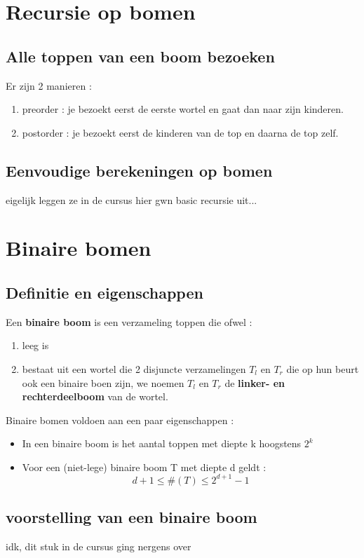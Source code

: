 \documentclass{report}
\begin{document}
  		\section{Recursie op bomen}
  			\subsection{Alle toppen van een boom bezoeken}
  				Er zijn 2 manieren : 
  				\begin{enumerate}
  					\item preorder : je bezoekt eerst de eerste wortel en gaat dan naar zijn kinderen. 
  					\item postorder : je bezoekt eerst de kinderen van de top en daarna de top zelf.
  				\end{enumerate}
  			\subsection{Eenvoudige berekeningen op bomen}
  				eigelijk leggen ze in de cursus hier gwn basic recursie uit...
  		\section{Binaire bomen}
  			\subsection{Definitie en eigenschappen}
  				Een \textbf{binaire boom} is een verzameling toppen die ofwel : 
  				\begin{enumerate}
  					\item leeg is
  					\item bestaat uit een wortel die 2 disjuncte verzamelingen \(T_l\) en \(T_r\) die op hun beurt ook een binaire boen zijn, we noemen  \(T_l\) en \(T_r\) de \textbf{linker- en rechterdeelboom} van de wortel.
  				\end{enumerate}
  				Binaire bomen voldoen aan een paar eigenschappen : 
  				\begin{itemize}
  					\item In een binaire boom is het aantal toppen met diepte k hoogstens \(2^k\)
  					\item Voor een (niet-lege) binaire boom T met diepte d geldt : \[d + 1 \leq \#(T) \leq 2^{d + 1} - 1\]
  				\end{itemize}
  			\subsection{voorstelling van een binaire boom}
  				idk, dit stuk in de cursus ging nergens over 
\end{document}
